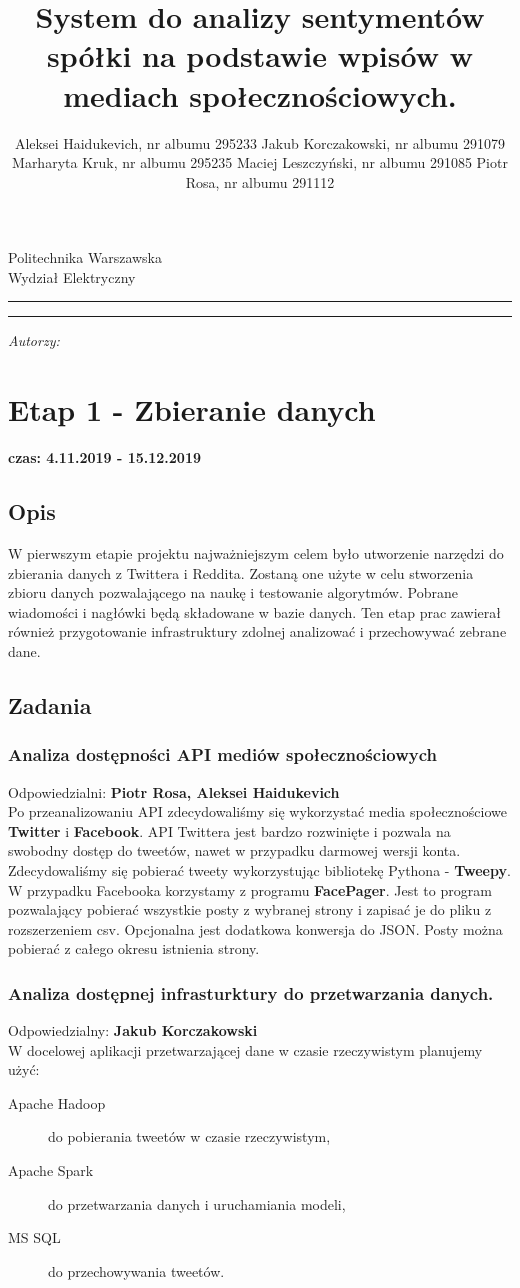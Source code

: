 \documentclass[a4paper,11pt, notitlepage ]{article}
\author{Aleksei Haidukevich, nr albumu 295233 \newline Jakub Korczakowski, nr albumu 291079 \newline Marharyta Kruk, nr albumu 295235 \newline Maciej Leszczyński, nr albumu 291085 \newline Piotr Rosa, nr albumu 291112}
\title{System do analizy sentymentów spółki na podstawie wpisów w mediach społecznościowych.}
\makeatletter
\newcommand{\linia}{\rule{\linewidth}{0.4mm}}
\renewcommand{\maketitle}{\begin{titlepage}
    \vspace*{1cm}
    \begin{center}\small
    Politechnika Warszawska\\
    Wydział Elektryczny
    \end{center}
    \vspace{3cm}
    \noindent\linia
    \begin{center}
      \LARGE \textsc{\@title}
         \end{center}
     \linia
    \vspace{0.5cm}
    \begin{flushright}
    \begin{minipage}{8cm}
    \textit{\small Autorzy:}\\
    \normalsize \textsc{\@author} \par
    \end{minipage}
    \end{flushright}
    \vspace*{\stretch{6}}
    \begin{center}
    \@date
    \end{center}
  \end{titlepage}%
}
\makeatother
\begin{document}
\maketitle
\setcounter{page}{2}
\tableofcontents
\newpage

\section{Etap 1 - Zbieranie danych}
\textbf{czas: 4.11.2019 - 15.12.2019}
\subsection{Opis} 
W pierwszym etapie projektu najważniejszym celem było utworzenie narzędzi do zbierania danych z Twittera i Reddita. Zostaną one użyte w celu stworzenia zbioru danych pozwalającego na naukę i testowanie algorytmów. Pobrane wiadomości i nagłówki będą składowane w bazie danych. Ten etap prac zawierał również przygotowanie infrastruktury zdolnej analizować i przechowywać zebrane dane.
\subsection{Zadania}
    \subsubsection{Analiza dostępności API mediów społecznościowych}
    Odpowiedzialni: \textbf{Piotr Rosa, Aleksei Haidukevich}\\
    Po przeanalizowaniu API zdecydowaliśmy się wykorzystać media społecznościowe \textbf{Twitter} i \textbf{Facebook}. API Twittera jest bardzo rozwinięte i pozwala na swobodny dostęp do tweetów, nawet w przypadku darmowej wersji konta. Zdecydowaliśmy się pobierać tweety wykorzystując bibliotekę Pythona - \textbf{Tweepy}. W przypadku Facebooka korzystamy z programu \textbf{FacePager}. Jest to program pozwalający pobierać wszystkie posty z wybranej strony i zapisać je do pliku z rozszerzeniem csv. Opcjonalna jest dodatkowa konwersja do JSON. Posty można pobierać z całego okresu istnienia strony.
    \subsubsection{Analiza dostępnej infrasturktury do przetwarzania danych.} 
    Odpowiedzialny: \textbf{Jakub Korczakowski}\\
    W docelowej aplikacji przetwarzającej dane w czasie rzeczywistym planujemy użyć:
    \begin{description}
        \item[Apache Hadoop] do pobierania tweetów w czasie rzeczywistym,
        \item[Apache Spark] do przetwarzania danych i uruchamiania modeli,
        \item[MS SQL] do przechowywania tweetów. 
    \end{description}
\end{document}
